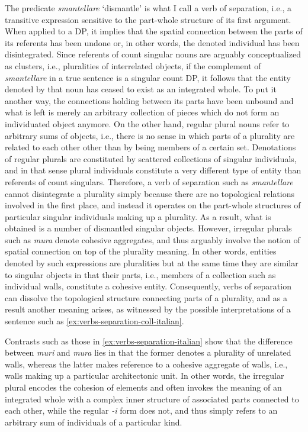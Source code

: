 The predicate \textit{smantellare} `dismantle' is what I call a verb of separation, i.e., a transitive expression sensitive to the part-whole structure of its first argument. When applied to a DP, it implies that the spatial connection between the parts of its referents has been undone or, in other words, the denoted individual has been disintegrated. Since referents of count singular nouns are arguably conceptualized as clusters, i.e., pluralities of interrelated objects, if the complement of \textit{smantellare} in a true sentence is a singular count DP, it follows that the entity denoted by that noun has ceased to exist as an integrated whole. To put it another way, the connections holding between its parts have been unbound and what is left is merely an arbitrary collection of pieces which do not form an individuated object anymore. On the other hand, regular plural nouns refer to arbitrary sums of objects, i.e., there is no sense in which parts of a plurality are related to each other other than by being members of a certain set. Denotations of regular plurals are constituted by scattered collections of singular individuals, and in that sense plural individuals constitute a very different type of entity than referents of count singulars. Therefore, a verb of separation such as \textit{smantellare} cannot disintegrate a plurality simply because there are no topological relations involved in the first place, and instead it operates on the part-whole structures of particular singular individuals making up a plurality. As a result, what is obtained is a number of dismantled singular objects. However, irregular plurals such as \textit{mura} denote cohesive aggregates, and thus arguably involve the notion of spatial connection on top of the plurality meaning. In other words, entities denoted by such expressions are pluralities but at the same time they are similar to singular objects in that their parts, i.e., members of a collection such as individual walls, constitute a cohesive entity. Consequently, verbs of separation can dissolve the topological structure connecting parts of a plurality, and as a result another meaning arises, as witnessed by the possible interpretations of a sentence such as \ref{ex:verbs-separation-coll-italian}.

Contrasts such as those in \ref{ex:verbs-separation-italian} show that the difference between \textit{muri} and \textit{mura} lies in that the former denotes a plurality of unrelated walls, whereas the latter makes reference to a cohesive aggregate of walls, i.e., walls making up a particular architectonic unit. In other words, the irregular plural encodes the cohesion of elements and often invokes the meaning of an integrated whole with a complex inner structure of associated parts connected to each other, while the regular \textit{-i} form does not, and thus simply refers to an arbitrary sum of individuals of a particular kind.

